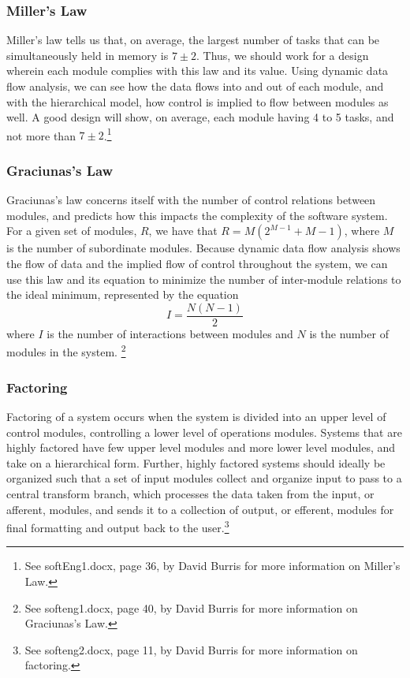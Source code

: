 \documentclass{article}
\begin{document}
		\subsubsection{Miller's Law}
			Miller's law tells us that, on average, the largest number of tasks that can be simultaneously held in memory is $7\pm2$. Thus, we should work for a design wherein each module complies with this law and its value. Using dynamic data flow analysis, we can see how the data flows into and out of each module, and with the hierarchical model, how control is implied to flow between modules as well. A good design will show, on average, each module having 4 to 5 tasks, and not more than $7\pm2$.\footnote{See softEng1.docx, page 36, by David Burris for more information on Miller's Law.}  
		\subsubsection{Graciunas's Law}
			Graciunas's law concerns itself with the number of control relations between modules, and predicts how this impacts the complexity of the software system. For a given set of modules, $R$, we have that $R = M(2^{M-1} + M - 1)$, where $M$ is the number of subordinate modules. Because dynamic data flow analysis shows the flow of data and the implied flow of control throughout the system, we can use this law and its equation to minimize the number of inter-module relations to the ideal minimum, represented by the equation 
			$$I = \frac{N(N - 1)}{2}$$
			where $I$ is the number of interactions between modules and $N$ is the number of modules in the system. \footnote{See softeng1.docx, page 40, by David Burris for more information on Graciunas's Law.}
		\subsubsection{Factoring}
			Factoring of a system occurs when the system is divided into an upper level of control modules, controlling a lower level of operations modules. Systems that are highly factored have few upper level modules and more lower level modules, and take on a hierarchical form. Further, highly factored systems should ideally be organized such that a set of input modules collect and organize input to pass to a central transform branch, which processes the data taken from the input, or afferent, modules, and sends it to a collection of output, or efferent, modules for final formatting and output back to the user.\footnote{See softeng2.docx, page 11, by David Burris for more information on factoring.} 
\end{document}
